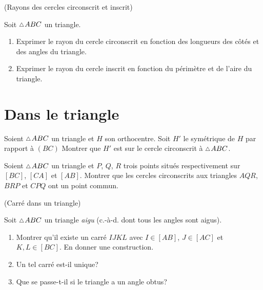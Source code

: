 \documentclass[a4paper,11pt,reqno]{amsart}
\begin{document}
\begin{exo} (Rayons des cercles circonscrit et inscrit)

  Soit $\tri ABC$ un triangle.
  \begin{enumerate}
    \item Exprimer le rayon du cercle circonscrit en fonction des longueurs des côtés et des angles du triangle.
    \item Exprimer le rayon du cercle inscrit en fonction du périmètre et de l'aire du triangle.
  \end{enumerate}
\end{exo}


\section{Dans le triangle}

\begin{exo}

  Soient $\tri ABC$ un triangle et $H$  son orthocentre. Soit $H'$ le symétrique de $H$ par rapport à $(BC)$ Montrer que $H'$ est sur le cercle circonscrit à $\tri ABC$.
\end{exo}

\begin{exo}

  Soient $\tri ABC$ un triangle et $P$, $Q$, $R$ trois points situés respectivement sur $[BC]$, $[CA]$ et $[AB]$. Montrer que les cercles circonscrits aux triangles $AQR$, $BRP$ et $CPQ$ ont un point commun.
\end{exo}


\begin{exo} (Carré dans un  triangle)

  Soit $\tri ABC$ un triangle \emph{aigu} (c.-à-d. dont tous les angles sont aigus).
  \begin{enumerate}
    \item Montrer qu'il existe un carré $IJKL$ avec $I \in [AB]$, $J \in [AC]$ et $K,L \in [BC]$. En donner une construction.
    \item Un tel carré est-il unique?
    \item Que se passe-t-il si le triangle a un angle obtus?
  \end{enumerate}
\end{exo}
\end{document}
